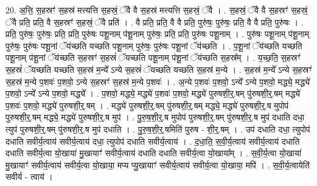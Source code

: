 \documentclass[17pt]{extarticle}
\begin{document}
20. अ॒त्ति॒ स॒हस्रꣳ॑ स॒हस्र॑ मत्त्यत्ति स॒हस्रं॒ ॅवै वै स॒हस्र॑ मत्त्यत्ति स॒हस्रं॒ ॅवै । . स॒हस्रं॒ ॅवै वै स॒हस्रꣳ॑ स॒हस्रं॒ ॅवै प्रति॒ प्रति॒ वै स॒हस्रꣳ॑ स॒हस्रं॒ ॅवै प्रति॑ । . वै प्रति॒ प्रति॒ वै वै प्रति॒ पुरु॑षः॒ पुरु॑षः॒ प्रति॒ वै वै प्रति॒ पुरु॑षः । . प्रति॒ पुरु॑षः॒ पुरु॑षः॒ प्रति॒ प्रति॒ पुरु॑षः पशू॒नाम् प॑शू॒नाम् पुरु॑षः॒ प्रति॒ प्रति॒ पुरु॑षः पशू॒नाम् । . पुरु॑षः पशू॒नाम् प॑शू॒नाम् पुरु॑षः॒ पुरु॑षः पशू॒नां ॅय॑च्छति यच्छति पशू॒नाम् पुरु॑षः॒ पुरु॑षः पशू॒नां ॅय॑च्छति । . प॒शू॒नां ॅय॑च्छति यच्छति पशू॒नाम् प॑शू॒नां ॅय॑च्छति स॒हस्रꣳ॑ स॒हस्रं॑ ॅयच्छति पशू॒नाम् प॑शू॒नां ॅय॑च्छति स॒हस्र᳚म् । . य॒च्छ॒ति॒ स॒हस्रꣳ॑ स॒हस्रं॑ ॅयच्छति यच्छति स॒हस्र॑ म॒न्ये᳚ ऽन्ये स॒हस्रं॑ ॅयच्छति यच्छति स॒हस्र॑ म॒न्ये । . स॒हस्र॑ म॒न्ये᳚ ऽन्ये स॒हस्रꣳ॑ स॒हस्र॑ म॒न्ये प॒शवः॑ प॒शवो॒ ऽन्ये स॒हस्रꣳ॑ स॒हस्र॑ म॒न्ये प॒शवः॑ । . अ॒न्ये प॒शवः॑ प॒शवो॒ ऽन्ये᳚ ऽन्ये प॒शवो॒ मद्ध्ये॒ मद्ध्ये॑ प॒शवो॒ ऽन्ये᳚ ऽन्ये प॒शवो॒ मद्ध्ये᳚ । . प॒शवो॒ मद्ध्ये॒ मद्ध्ये॑ प॒शवः॑ प॒शवो॒ मद्ध्ये॑ पुरुषशी॒र्॒.षम् पु॑रुषशी॒र्॒.षम् मद्ध्ये॑ प॒शवः॑ प॒शवो॒ मद्ध्ये॑ पुरुषशी॒र्॒.षम् । . मद्ध्ये॑ पुरुषशी॒र्॒.षम् पु॑रुषशी॒र्॒.षम् मद्ध्ये॒ मद्ध्ये॑ पुरुषशी॒र्॒.ष मुपोप॑ पुरुषशी॒र्॒.षम् मद्ध्ये॒ मद्ध्ये॑ पुरुषशी॒र्॒.ष मुप॑ । . पु॒रु॒ष॒शी॒र्॒.ष मुपोप॑ पुरुषशी॒र्॒.षम् पु॑रुषशी॒र्॒.ष मुप॑ दधाति दधा॒ त्युप॑ पुरुषशी॒र्॒.षम् पु॑रुषशी॒र्॒.ष मुप॑ दधाति । . पु॒रु॒ष॒शी॒र्॒.षमिति॑ पुरुष - शी॒र्॒.षम् । . उप॑ दधाति दधा॒ त्युपोप॑ दधाति सवीर्य॒त्वाय॑ सवीर्य॒त्वाय॑ दधा॒ त्युपोप॑ दधाति सवीर्य॒त्वाय॑ । . द॒धा॒ति॒ स॒वी॒र्य॒त्वाय॑ सवीर्य॒त्वाय॑ दधाति दधाति सवीर्य॒त्वा यो॒खाया॑ मु॒खायाꣳ॑ सवीर्य॒त्वाय॑ दधाति दधाति सवीर्य॒त्वा यो॒खाया᳚म् । . स॒वी॒र्य॒त्वा यो॒खाया॑ मु॒खायाꣳ॑ सवीर्य॒त्वाय॑ सवीर्य॒त्वा यो॒खाया॒ मप्य प्यु॒खायाꣳ॑ सवीर्य॒त्वाय॑ सवीर्य॒त्वा यो॒खाया॒ मपि॑ । . स॒वी॒र्य॒त्वायेति॑ सवीर्य - त्वाय॑ । \newline
\end{document}
